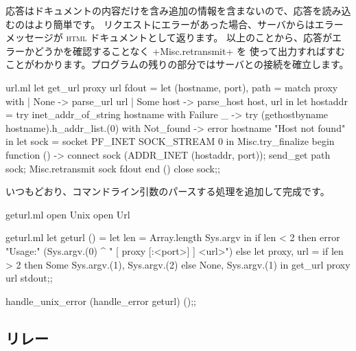 応答はドキュメントの内容だけを含み追加の情報を含まないので、応答を読み込むのはより簡単です。
リクエストにエラーがあった場合、サーバからはエラーメッセージが
\textsc{html} ドキュメントとして返ります。
以上のことから、応答がエラーかどうかを確認することなく \ml+Misc.retransmit+ を
使って出力すればすむことがわかります。プログラムの残りの部分ではサーバとの接続を確立します。
%
\begin{listingcodefile}{url.ml}
let get_url proxy url fdout =
  let (hostname, port), path = match proxy with
    | None -> parse_url url
    | Some host -> parse_host host, url
  in
  let hostaddr =
    try inet_addr_of_string hostname
    with Failure _ ->
      try (gethostbyname hostname).h_addr_list.(0)
      with Not_found -> error hostname "Host not found"
  in
  let sock = socket PF_INET SOCK_STREAM 0 in
  Misc.try_finalize
    begin function () ->
      connect sock (ADDR_INET (hostaddr, port));
      send_get path sock;
      Misc.retransmit sock fdout
    end ()
    close sock;;
\end{listingcodefile}
%
いつもどおり、コマンドライン引数のパースする処理を追加して完成です。
%
\begin{codefile}{geturl.ml}
open Unix
open Url
\end{codefile}
%
\begin{listingcodefile}{geturl.ml}
let geturl () =
  let len =  Array.length Sys.argv in
  if len < 2 then
    error "Usage:" (Sys.argv.(0) ^ " [ proxy [:<port>] ] <url>")
  else
    let proxy, url =
      if len > 2 then Some Sys.argv.(1), Sys.argv.(2) else
      None, Sys.argv.(1)
    in
    get_url proxy url stdout;;

handle_unix_error (handle_error geturl) ();;
\end{listingcodefile}

\subsection*{\label{sec/relay}{\normalfont\http} リレー}

